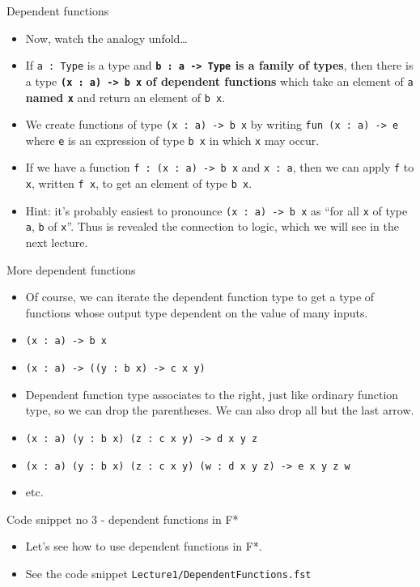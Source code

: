 \documentclass{beamer}
\newcommand{\m}[1]{\texttt{#1}}
\begin{document}
\begin{frame}{Dependent functions}
\begin{itemize}
	\item Now, watch the analogy unfold\dots
	\item If \m{a :\ Type} is a type and \textbf{\m{b :\ a -> Type} is a family of types}, then there is a type \textbf{\m{(x :\ a) -> b x} of dependent functions} which take an element of \m{a} \textbf{named \m{x}} and return an element of \m{b x}.
	\item We create functions of type \m{(x :\ a) -> b x} by writing \m{fun (x :\ a) -> e} where \m{e} is an expression of type \m{b x} in which \m{x} may occur.
	\item If we have a function \m{f :\ (x :\ a) -> b x} and \m{x :\ a}, then we can apply \m{f} to \m{x}, written \m{f x}, to get an element of type \m{b x}.
	\item Hint: it's probably easiest to pronounce \m{(x :\ a) -> b x} as ``for all \m{x} of type \m{a}, \m{b} of \m{x}''. Thus is revealed the connection to logic, which we will see in the next lecture.
\end{itemize}
\end{frame}

\begin{frame}{More dependent functions}
\begin{itemize}
	\item Of course, we can iterate the dependent function type to get a type of functions whose output type dependent on the value of many inputs.
	\item \m{(x :\ a) -> b x}
	\item \m{(x :\ a) -> ((y :\ b x) -> c x y)}
	\item Dependent function type associates to the right, just like ordinary function type, so we can drop the parentheses. We can also drop all but the last arrow.
	\item \m{(x :\ a) (y :\ b x) (z :\ c x y) -> d x y z}
	\item \m{(x :\ a) (y :\ b x) (z :\ c x y) (w : d x y z) -> e x y z w}
	\item etc.
\end{itemize}
\end{frame}

\begin{frame}{Code snippet no 3 - dependent functions in F*}
\begin{itemize}
	\item Let's see how to use dependent functions in F*.
	\item See the code snippet \m{Lecture1/DependentFunctions.fst}
\end{itemize}
\end{frame}
\end{document}
